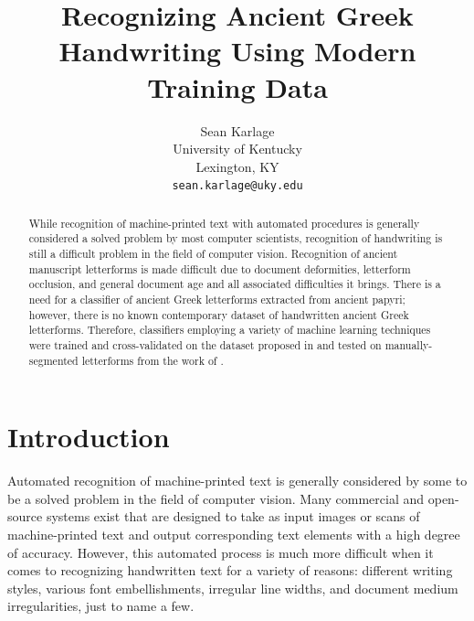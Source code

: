 \documentclass[10pt,twocolumn,letterpaper]{article}
\begin{document}
\title{Recognizing Ancient Greek Handwriting Using Modern Training Data}

\author{Sean Karlage\\
University of Kentucky\\
Lexington, KY\\
{\tt\small sean.karlage@uky.edu}
}

\maketitle

\begin{abstract}
    While recognition of machine-printed text with automated procedures is generally considered a solved problem by most computer scientists, recognition of handwriting is still a difficult problem in the field of computer vision. Recognition of ancient manuscript letterforms is made difficult due to document deformities, letterform occlusion, and general document age and all associated difficulties it brings.  There is a need for a classifier of ancient Greek letterforms extracted from ancient papyri; however, there is no known contemporary dataset of handwritten ancient Greek letterforms. Therefore, classifiers employing a variety of machine learning techniques were trained and cross-validated on the dataset proposed in \cite{GCDB} and tested on manually-segmented letterforms from the work of \cite{BYU}.
\end{abstract}

\section{Introduction}

Automated recognition of machine-printed text is generally considered by some to be a solved problem in the field of computer vision. Many commercial and open-source systems exist that are designed to take as input images or scans of machine-printed text and output corresponding text elements with a high degree of accuracy. However, this automated process is much more difficult when it comes to recognizing handwritten text for a variety of reasons: different writing styles, various font embellishments, irregular line widths, and document medium irregularities, just to name a few.
\end{document}
